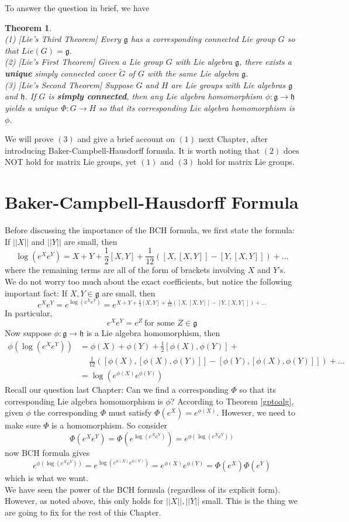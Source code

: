 \documentclass[11pt]{article}
\newtheorem{theorem}{Theorem}[section]
\newcommand{\mf}[1]{\mathfrak{#1}}
\begin{document}
\noindent To answer the question in brief, we have\\
\begin{theorem} \label{lietheorem} \mbox{}\\
(1) [Lie's Third Theorem] Every $\mf{g}$ has a corresponding connected Lie group $G$ so that $Lie(G) = \mf{g}$.\\
(2) [Lie's First Theorem] Given a Lie group $G$ with Lie algebra $\mf{g}$, there exists a \textbf{unique} simply connected cover $\tilde{G}$ of $G$ with the same Lie algebra $\mf{g}$.\\
(3) [Lie's Second Theorem] Suppose $G$ and $H$ are Lie groups with Lie algebras $\mf{g}$ and $\mf{h}$. If $G$ is \textbf{simply connected}, then any Lie algebra homomorphism $\phi: \mf{g} \to \mf{h}$ yields a unique $\Phi: G \to H$ so that its corresponding Lie algebra homomorphism is $\phi$.
\end{theorem}

We will prove $(3)$ and give a brief account on $(1)$ next Chapter, after introducing Baker-Campbell-Hausdorff formula. It is worth noting that $(2)$ does NOT hold for matrix Lie groups, yet $(1)$ and $(3)$ hold for matrix Lie groups.

\newpage
\section{Baker-Campbell-Hausdorff Formula}
Before discussing the importance of the BCH formula, we first state the formula: If $||X||$ and $||Y||$ are small, then
$$\log(e^Xe^Y) = X+Y + \frac{1}{2}[X,Y] + \frac{1}{12}([X,[X,Y]] - [Y,[X,Y]]) + \dots$$
where the remaining terms are all of the form of brackets involving $X$ and $Y$'s. We do not worry too much about the exact coefficients, but notice the following important fact: If $X, Y \in \mf{g}$ are small, then
$$e^Xe^Y = e^{\log(e^Xe^Y)} = e^{X+Y + \frac{1}{2}[X,Y] + \frac{1}{12}([X,[X,Y]] - [Y,[X,Y]]) + \dots}$$
In particular,
$$e^Xe^Y = e^Z\ \text{for some }Z \in \mf{g}$$
Now suppose $\phi: \mf{g} \to \mf{h}$ is a Lie algebra homomorphism, then
\begin{align*}
\phi(\log(e^Xe^Y)) &= \phi(X) + \phi(Y) + \frac{1}{2}[\phi(X),\phi(Y)] +\\
& \ \  \ \ \ \frac{1}{12}([\phi(X),[\phi(X),\phi(Y)]] - [\phi(Y),[\phi(X),\phi(Y)]]) + \dots \\
&= \log(e^{\phi(X)}e^{\phi(Y)})
\end{align*}
Recall our question last Chapter: Can we find a corresponding $\Phi$ so that its corresponding Lie algebra homomorphism is $\phi$? According to Theorem \ref{gptoalg}, given $\phi$ the corresponding $\Phi$ must satisfy $\Phi(e^X) = e^{\phi(X)}$. However, we need to make sure $\Phi$ is a homomorphism. So consider
$$\Phi(e^Xe^Y) = \Phi(e^{\log(e^Xe^Y)}) = e^{\phi(\log(e^{X}e^{Y}))}$$
now BCH formula gives
$$e^{\phi(\log(e^{X}e^{Y}))} = e^{\log(e^{\phi(X)}e^{\phi(Y)})} = e^{\phi(X)}e^{\phi(Y)} = \Phi(e^X)\Phi(e^Y)$$
which is what we want. \\
We have seen the power of the BCH formula (regardless of its explicit form). However, as noted above, this only holds for $||X||, ||Y||$ small. This is the thing we are going to fix for the rest of this Chapter.
\end{document}
